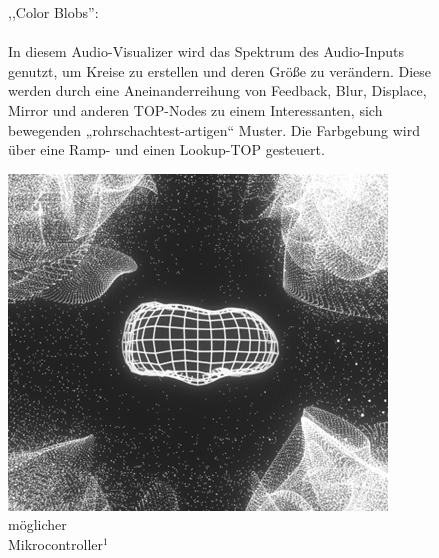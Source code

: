 \documentclass[12pt]{scrartcl}%
\theoremstyle{nonumberplain}
\begin{document}
\begin{figure}[h]
   \begin{minipage}[b]{.4\linewidth}
     ,,Color Blobs'':
     \\\\
In diesem Audio-Visualizer wird das Spektrum des Audio-Inputs genutzt, um Kreise zu erstellen und deren Größe zu verändern. Diese werden durch eine Aneinanderreihung von Feedback, Blur, Displace, Mirror und anderen TOP-Nodes zu einem Interessanten, sich bewegenden „rohrschachtest-artigen“ Muster. Die Farbgebung wird über eine Ramp- und einen Lookup-TOP gesteuert.
   \end{minipage}
   \hspace{.1\linewidth}
   \begin{minipage}[b]{.4\linewidth}
      \includegraphics[width=\linewidth]{sunvox_5}
      \caption{möglicher\\Mikrocontroller${}^{1}$}
   \end{minipage}
\end{figure}
\end{document}
